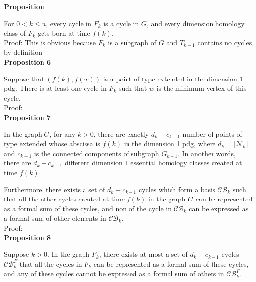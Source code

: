\documentclass[a4paper,12pt]{article}
\numberwithin{equation}{section}
\begin{document}
	
	
	
	
	\noindent \textbf{Proposition } 
	
	For $0 < k \leq n$, every cycle in $F_k$ is a cycle in $G$, and every dimension homology class of $F_k$ gets born at time $f(k)$.\\
	
	\noindent Proof: This is obvious because $F_k$ is a subgraph of $G$ and $T_{k-1}$ contains no cycles by definition.\\
	
	
	\noindent \textbf{Proposition 6}
	
	Suppose that $(f(k), f(w))$ is a point of type extended in the dimension 1 pdg. There is at least one cycle in $F_k$ such that $w$ is the minimum vertex of this cycle.\\
	
	\noindent Proof:\\
	
	\noindent \textbf{Proposition 7}
	
	In the graph $G$, for any $k>0$, there are exactly $d_k - c_{k-1}$ number of points of type extended whose abscissa is $f(k)$ in the dimension 1 pdg, where $d_k = \vert \mathcal{N}^-_{k} \vert$ and $c_{k-1}$ is the connected components of subgraph $G_{k-1}$. In another words, there are $d_k - c_{k-1}$ different dimension 1 essential homology classes created at time $f(k)$.
	
	Furthermore, there exists a set of $d_k - c_{k-1}$ cycles which form a basis $\mathcal{CB}_k$ such that all the other cycles created at time $f(k)$ in the graph $G$ can be represented as a formal sum of these cycles, and non of the cycle in $\mathcal{CB}_k$ can be expressed as a formal sum of other elements in $\mathcal{CB}_k$.\\
	
	\noindent Proof:\\
	
	\noindent \textbf{Proposition 8}
	
	Suppose $k>0$. In the graph $F_k$, there exists at most a set of $d_k - c_{k-1}$ cycles $\mathcal{CB}^{F}_k$ that all the cycles in $F_k$ can be represented as a formal sum of these cycles, and any of these cycles cannot be expressed as a formal sum of others in $\mathcal{CB}^F_k$.\\
	
\end{document}
